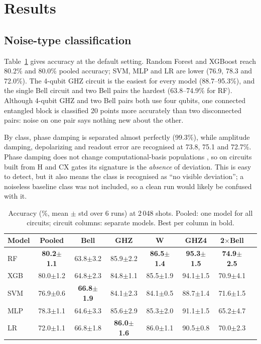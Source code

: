 \documentclass[conference]{IEEEtran}
\begin{document}
\section{Results}\label{sec:results}
\subsection{Noise-type classification}
Table~\ref{tab:main} gives accuracy at the default setting. Random Forest and XGBoost reach 80.2\% and 80.0\% pooled accuracy; SVM, MLP and LR are lower (76.9, 78.3 and 72.0\%). The 4-qubit GHZ circuit is the easiest for every model (88.7--95.3\%), and the single Bell circuit and two Bell pairs the hardest (63.8--74.9\% for RF). Although 4-qubit GHZ and two Bell pairs both use four qubits, one connected entangled block is classified 20 points more accurately than two disconnected pairs: noise on one pair says nothing new about the other.

By class, phase damping is separated almost perfectly (99.3\%), while amplitude damping, depolarizing and readout error are recognised at 73.8, 75.1 and 72.7\%. Phase damping does not change computational-basis populations \cite{nielsen}, so on circuits built from H and CX gates its signature is the \emph{absence} of deviation. This is easy to detect, but it also means the class is recognised as ``no visible deviation''; a noiseless baseline class was not included, so a clean run would likely be confused with it.

\begin{table}[!t]
\caption{Accuracy (\%, mean $\pm$ std over 6 runs) at 2\,048 shots. Pooled: one model for all circuits; circuit columns: separate models. Best per column in bold.}
\label{tab:main}
\centering\scriptsize\setlength{\tabcolsep}{2.2pt}
\begin{tabular}{@{}lccccccc@{}}
\toprule
Model & Pooled & Bell & GHZ & W & GHZ4 & 2$\times$Bell\\
\midrule
RF & \textbf{80.2$\pm$1.1} & 63.8$\pm$3.2 & 85.9$\pm$2.2 & \textbf{86.5$\pm$1.4} & \textbf{95.3$\pm$1.5} & \textbf{74.9$\pm$2.5} \\
XGB & 80.0$\pm$1.2 & 64.8$\pm$2.3 & 84.8$\pm$1.1 & 85.5$\pm$1.9 & 94.1$\pm$1.5 & 70.9$\pm$4.1 \\
SVM & 76.9$\pm$0.6 & \textbf{66.8$\pm$1.9} & 84.1$\pm$2.3 & 84.1$\pm$0.5 & 88.7$\pm$1.4 & 71.6$\pm$1.5 \\
MLP & 78.3$\pm$1.1 & 64.6$\pm$3.3 & 85.6$\pm$2.9 & 85.3$\pm$2.0 & 91.1$\pm$1.5 & 65.2$\pm$4.7 \\
LR & 72.0$\pm$1.1 & 66.8$\pm$1.8 & \textbf{86.0$\pm$1.6} & 86.0$\pm$1.1 & 90.5$\pm$0.8 & 70.0$\pm$2.3 \\
\bottomrule
\end{tabular}
\end{table}
\end{document}
